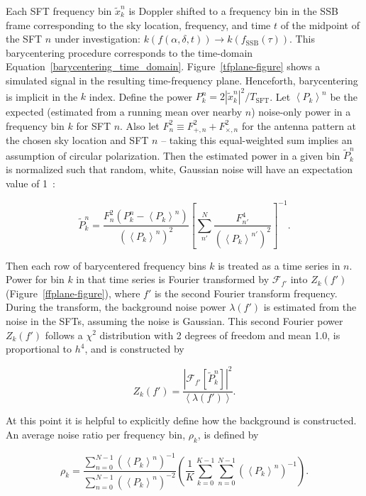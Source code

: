 Each SFT frequency bin $\tilde{x}^n_k$ is Doppler shifted to a frequency bin in the SSB frame corresponding to the sky location, frequency, and time $t$ of the midpoint of the SFT $n$ under investigation: $k(f(\alpha,\delta,t)) \rightarrow k(f_\mathrm{SSB}(\tau))$.
This barycentering procedure corresponds to the time-domain Equation~\ref{barycentering_time_domain}.
Figure~\ref{tfplane-figure}
shows a simulated signal in the resulting time-frequency plane.
Henceforth, barycentering is implicit in the $k$ index.
Define the power $P^n_k = 2|\tilde{x}^n_k|^2/T_\mathrm{SFT}$.
Let $\left<P_k\right>^n$ be the expected (estimated from a running mean over nearby $n$) noise-only power in a frequency bin $k$ for SFT $n$.
Also let $F^2_n \equiv F_{+,n}^2 + F_{\times,n}^2$ for the antenna pattern at the chosen sky location and SFT $n$ -- taking this equal-weighted sum implies an assumption of circular polarization. 
Then the estimated power in a given bin $\tilde{P}^n_k$ is normalized such that random, white, Gaussian noise will have an expectation value of 1~\cite{GoetzTwoSpectMethods2011}:

\begin{equation}
\tilde{P}^n_k = \frac{F_n^2 (P_k^n - \left<P_k\right>^n)}{(\left<P_k\right>^n)^2}\left[\sum\limits_{n'}^N \frac{F_{n'}^4}{(\left<P_k\right>^{n'})^2} \right]^{-1}.
\label{equation_with_antenna_pattern}
\end{equation}

Then each row of barycentered frequency bins $k$ is treated as a time series in $n$.
Power for bin $k$ in that time series is Fourier transformed by $\mathcal{F}_{f'}$ into $Z_k(f')$ (Figure~\ref{ffplane-figure}), where $f'$ is the second Fourier transform frequency.
During the transform, the background noise power $\lambda(f')$ is estimated from the noise in the SFTs, assuming the noise is Gaussian.
This second Fourier power $Z_k(f')$ follows a $\chi^2$ distribution with 2 degrees of freedom and mean 1.0, is proportional to $h^4$, and is constructed by 

\begin{equation}
Z_k(f') = \frac{\left| \mathcal{F}_{f'} [\tilde{P}^n_k]  \right|^2}{\left< \lambda(f') \right>}.
\label{second_Fourier_power}
\end{equation}

At this point it is helpful to explicitly define how the background is constructed.
An average noise ratio per frequency bin, $\rho_k$, is defined by

\begin{equation}
\rho_k = \frac{\sum_{n=0}^{N-1} \left(\left<P_k\right>^n\right)^{-1}}{\sum_{n=0}^{N-1} \left(\left<P_k\right>^n\right)^{-2}} \left(\frac{1}{K} \sum_{k=0}^{K-1} \sum_{n=0}^{N-1} \left(\left<P_k\right>^n\right)^{-1} \right).
\end{equation}

